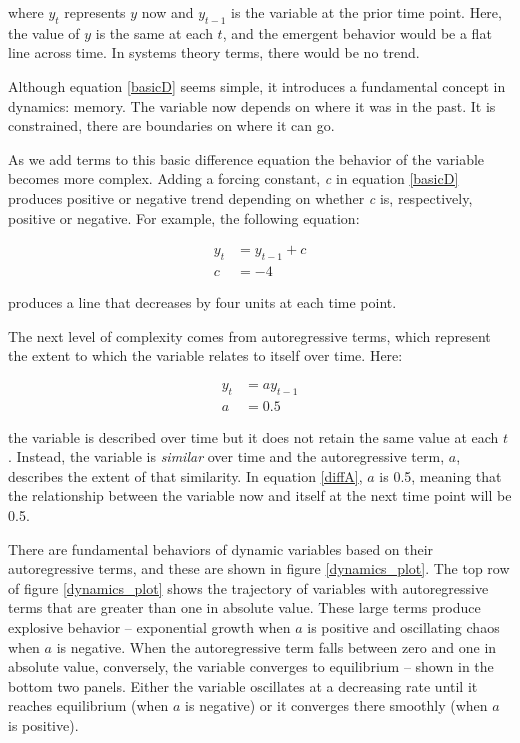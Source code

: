 \documentclass[english,,man]{apa6}
\theoremstyle{definition}
\theoremstyle{definition}
\theoremstyle{definition}
\theoremstyle{remark}
\begin{document}
\noindent where \(y_{t}\) represents \(y\) now and \(y_{t-1}\) is the
variable at the prior time point. Here, the value of \(y\) is the same
at each \(t\), and the emergent behavior would be a flat line across
time. In systems theory terms, there would be no trend.

Although equation \ref{basicD} seems simple, it introduces a fundamental
concept in dynamics: memory. The variable now depends on where it was in
the past. It is constrained, there are boundaries on where it can go.

As we add terms to this basic difference equation the behavior of the
variable becomes more complex. Adding a forcing constant, \emph{c} in
equation \ref{basicD} produces positive or negative trend depending on
whether \emph{c} is, respectively, positive or negative. For example,
the following equation:

\begin{equation}
\begin{split}
\label{diffC}
y_{t} &= y_{t-1} + c \\ 
c &= -4
\end{split}
\end{equation}

\noindent produces a line that decreases by four units at each time
point.

The next level of complexity comes from autoregressive terms, which
represent the extent to which the variable relates to itself over time.
Here:

\begin{equation}
\begin{split}
\label{diffA}
y_{t} &= a y_{t-1} \\ 
a &= 0.5
\end{split}
\end{equation}

\noindent the variable is described over time but it does not retain the
same value at each \(t\). Instead, the variable is \emph{similar} over
time and the autoregressive term, \(a\), describes the extent of that
similarity. In equation \ref{diffA}, \(a\) is 0.5, meaning that the
relationship between the variable now and itself at the next time point
will be 0.5.

There are fundamental behaviors of dynamic variables based on their
autoregressive terms, and these are shown in figure \ref{dynamics_plot}.
The top row of figure \ref{dynamics_plot} shows the trajectory of
variables with autoregressive terms that are greater than one in
absolute value. These large terms produce explosive behavior --
exponential growth when \(a\) is positive and oscillating chaos when
\(a\) is negative. When the autoregressive term falls between zero and
one in absolute value, conversely, the variable converges to equilibrium
-- shown in the bottom two panels. Either the variable oscillates at a
decreasing rate until it reaches equilibrium (when \(a\) is negative) or
it converges there smoothly (when \(a\) is positive).
\end{document}
